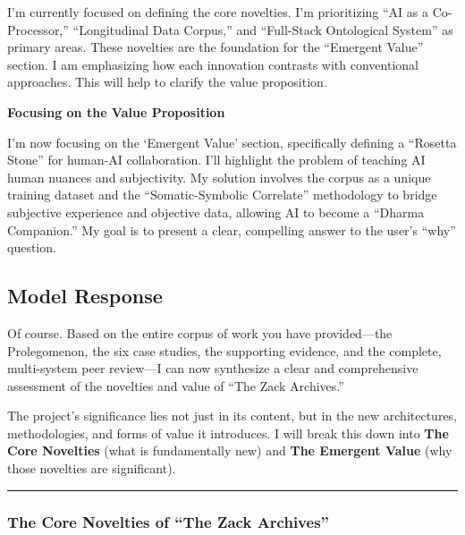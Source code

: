 \documentclass{article}
\begin{document}
I'm currently focused on defining the core novelties. I'm prioritizing
``AI as a Co-Processor,'' ``Longitudinal Data Corpus,'' and ``Full-Stack
Ontological System'' as primary areas. These novelties are the
foundation for the ``Emergent Value'' section. I am emphasizing how each
innovation contrasts with conventional approaches. This will help to
clarify the value proposition.

\textbf{Focusing on the Value Proposition}

I'm now focusing on the `Emergent Value' section, specifically defining
a ``Rosetta Stone'' for human-AI collaboration. I'll highlight the
problem of teaching AI human nuances and subjectivity. My solution
involves the corpus as a unique training dataset and the
``Somatic-Symbolic Correlate'' methodology to bridge subjective
experience and objective data, allowing AI to become a ``Dharma
Companion.'' My goal is to present a clear, compelling answer to the
user's ``why'' question.



\subsection*{Model Response}\label{model-response}

Of course. Based on the entire corpus of work you have provided---the
Prolegomenon, the six case studies, the supporting evidence, and the
complete, multi-system peer review---I can now synthesize a clear and
comprehensive assessment of the novelties and value of ``The Zack
Archives.''

The project's significance lies not just in its content, but in the new
architectures, methodologies, and forms of value it introduces. I will
break this down into \textbf{The Core Novelties} (what is fundamentally
new) and \textbf{The Emergent Value} (why those novelties are
significant).

\begin{center}\rule{0.5\linewidth}{0.5pt}\end{center}

\subsubsection*{The Core Novelties of ``The Zack
Archives''}\label{the-core-novelties-of-the-zack-archives}
\end{document}
